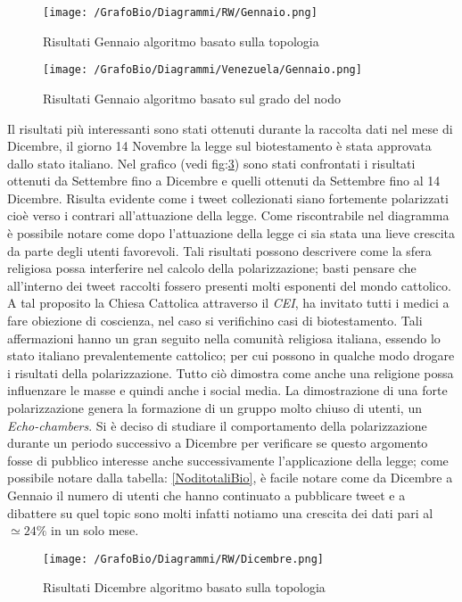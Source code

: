 \begin{figure}[!ht]
\centering
\texttt{[image: /GrafoBio/Diagrammi/RW/Gennaio.png]}
\caption{Risultati Gennaio algoritmo basato sulla topologia}
\label{diagrammaGen1}
\end{figure}
\begin{figure}[!ht]
\centering
\texttt{[image: /GrafoBio/Diagrammi/Venezuela/Gennaio.png]}
\caption{Risultati Gennaio algoritmo basato sul grado del nodo}
\label{diagrammaGen2}
\end{figure}

Il risultati più interessanti sono stati ottenuti durante la raccolta dati nel mese di Dicembre, il giorno 14 Novembre la legge sul biotestamento è stata approvata dallo stato italiano. Nel grafico (vedi fig:\ref{DicembrevsDicembre}) sono stati confrontati i risultati ottenuti da Settembre fino a Dicembre e quelli ottenuti da Settembre fino al 14 Dicembre. Risulta evidente come i tweet collezionati siano fortemente polarizzati cioè verso i contrari all'attuazione della legge. Come riscontrabile nel diagramma è possibile notare come dopo l'attuazione della legge ci sia stata una lieve crescita da parte degli utenti favorevoli.
Tali risultati possono descrivere come la sfera religiosa possa interferire nel calcolo della polarizzazione; basti pensare che all'interno dei tweet raccolti fossero presenti molti esponenti del mondo cattolico.
A tal proposito la Chiesa Cattolica attraverso il \textit{CEI}, ha invitato tutti i medici a fare obiezione di coscienza, nel caso si verifichino casi di biotestamento. Tali affermazioni hanno un gran seguito nella comunità religiosa italiana, essendo lo stato italiano prevalentemente cattolico; per cui possono in qualche modo drogare i risultati della polarizzazione.\cite{BiotestamentoCris}
Tutto ciò dimostra come anche una religione possa influenzare le masse e quindi anche i social media.
La dimostrazione di una forte polarizzazione genera la formazione di un gruppo molto chiuso di utenti, un \textit{Echo-chambers}. 
Si è deciso di studiare il comportamento della polarizzazione durante un periodo successivo a Dicembre per verificare se questo argomento fosse di pubblico interesse anche successivamente l'applicazione della legge; come possibile notare dalla tabella: \ref{NoditotaliBio}, è facile notare come da Dicembre a Gennaio il numero di utenti che hanno continuato a pubblicare tweet e a dibattere su quel topic sono molti infatti notiamo una crescita dei dati pari al $\simeq 24\%$ in un solo mese.
\begin{figure}[!ht]
\centering
\texttt{[image: /GrafoBio/Diagrammi/RW/Dicembre.png]}
\caption{Risultati Dicembre algoritmo basato sulla topologia}
\label{DicembrevsDicembre}
\end{figure}

